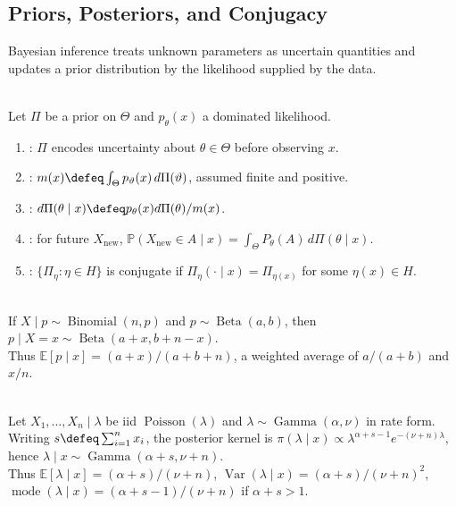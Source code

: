 \subsection{Priors, Posteriors, and Conjugacy}

Bayesian inference treats unknown parameters as uncertain quantities and updates a prior distribution by the likelihood supplied by the data.

\begin{definition} \label{def:prior-posterior-predictive} \label{def:conjugate-prior-family} \\
Let $\Pi$ be a prior on $\Theta$ and $p_\theta(x)$ a dominated likelihood.
\begin{enumerate}[label=(\roman*)]
\setlength{\itemsep}{0pt}
\item {}: $\Pi$ encodes uncertainty about $\theta\in\Theta$ before observing $x$.
\item {}: $m(x)\defeq\int_\Theta p_\vartheta(x)\,d\Pi(\vartheta)$, assumed finite and positive.
\item {}: $d\Pi(\theta\mid x)\defeq p_\theta(x)d\Pi(\theta)/m(x)$.
\item {}: for future $X_{\mathrm{new}}$, $\mathbb{P}(X_{\mathrm{new}}\in A\mid x)=\int_\Theta P_\theta(A)\,d\Pi(\theta\mid x)$.
\item {}: $\{\Pi_\eta:\eta\in H\}$ is conjugate if $\Pi_\eta(\cdot\mid x)=\Pi_{\eta(x)}$ for some $\eta(x)\in H$.
\end{enumerate}
\end{definition}

\begin{example} \label{ex:beta-binomial-conjugacy} \\
If $X\mid p\sim\operatorname{Binomial}(n,p)$ and $p\sim\operatorname{Beta}(a,b)$, then $p\mid X=x\sim\operatorname{Beta}(a+x,b+n-x)$.\\
Thus $\mathbb{E}[p\mid x]=(a+x)/(a+b+n)$, a weighted average of $a/(a+b)$ and $x/n$.
\end{example}

\begin{example} \label{ex:gamma-poisson-conjugacy-rate} \\
Let $X_1,\ldots,X_n\mid\lambda$ be iid $\operatorname{Poisson}(\lambda)$ and $\lambda\sim\operatorname{Gamma}(\alpha,\nu)$ in rate form.\\
Writing $s\defeq\sum_{i=1}^nx_i$, the posterior kernel is $\pi(\lambda\mid x)\propto\lambda^{\alpha+s-1}e^{-(\nu+n)\lambda}$, hence $\lambda\mid x\sim\operatorname{Gamma}(\alpha+s,\nu+n)$.\\
Thus $\mathbb{E}[\lambda\mid x]=(\alpha+s)/(\nu+n)$, $\operatorname{Var}(\lambda\mid x)=(\alpha+s)/(\nu+n)^2$, $\operatorname{mode}(\lambda\mid x)=(\alpha+s-1)/(\nu+n)$ if $\alpha+s>1$.
\end{example}

